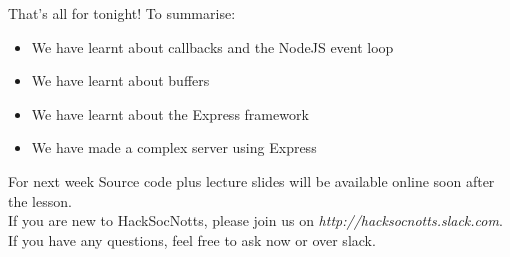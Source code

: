 \documentclass{beamer}
\begin{document}
\begin{frame}{That's all for tonight!}
  To summarise:
  \begin{itemize}
  \item We have learnt about callbacks and the NodeJS event loop
  \item We have learnt about buffers
  \item We have learnt about the Express framework
  \item We have made a complex server using Express
  \end{itemize}
\end{frame}

\begin{frame}{For next week}
Source code plus lecture slides will be available online soon after the lesson.\\
If you are new to HackSocNotts, please join us on \textit{http://hacksocnotts.slack.com}.\\
If you have any questions, feel free to ask now or over slack.\\
\end{frame}
\end{document}
